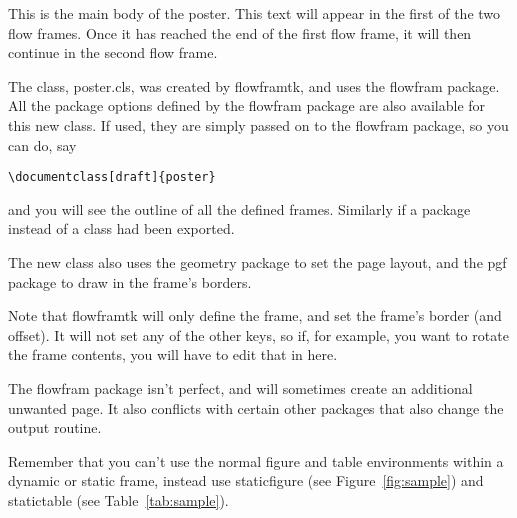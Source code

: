 \documentclass{poster}%
\begin{document}
This is the main body of the poster. This text will
appear in the first of the two flow frames. Once it
has reached the end of the first flow frame, it will then
continue in the second flow frame.

The class, poster.cls, was created by flowframtk, and
uses the flowfram package. All the package options 
defined by the flowfram package are also available for
this new class. If used, they are simply passed on to the
flowfram package, so you can do, say
\begin{verbatim}
\documentclass[draft]{poster}
\end{verbatim}
and you will see the outline of all the defined frames.
Similarly if a package instead of a class had been exported.

The new class also uses the geometry package to 
set the page layout, and the pgf package to draw in the
frame's borders.

Note that flowframtk will only define the frame, and set the
frame's border (and offset). It will not set any of the
other keys, so if, for example, you want to rotate the
frame contents, you will have to edit that in here.

The flowfram package isn't perfect, and will sometimes
create an additional unwanted page. It also conflicts
with certain other packages that also change the output
routine.

Remember that you can't use the normal figure and
table environments within a dynamic or static frame,
instead use staticfigure (see Figure~\ref{fig:sample}) 
and statictable (see Table~\ref{tab:sample}).
\end{document}
